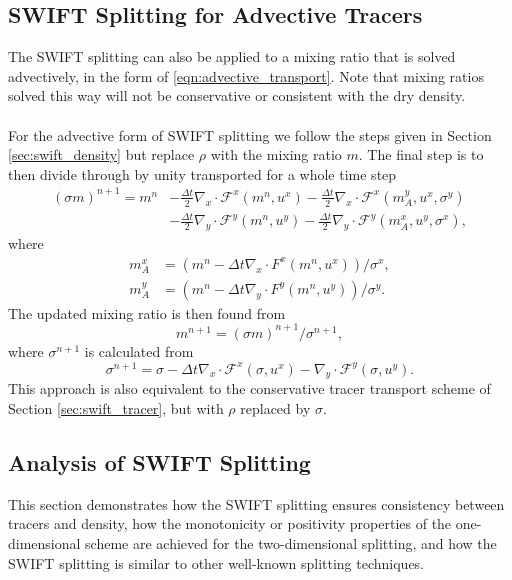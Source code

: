 \documentclass[11pt,a4paper]{article}
\begin{document}
\subsection{SWIFT Splitting for Advective Tracers}

The SWIFT splitting can also be applied to a mixing ratio that is solved advectively, in the form of \eqref{eqn:advective_transport}. Note that mixing ratios solved this way will not be conservative or consistent with the dry density. \\ 
\\
For the advective form of SWIFT splitting we follow the steps given in Section \ref{sec:swift_density} but replace $\rho$ with the mixing ratio $m$. The final step is to then divide through by unity transported for a whole time step
\begin{equation}
\begin{split}
(\sigma m)^{n+1} = m^{n} & - \frac{\Delta{t}}{2}\nabla_x\cdot \mathcal{F}^x(m^n, u^x) - \frac{\Delta{t}}{2}\nabla_x\cdot \mathcal{F}^x(m^y_A, u^x, \sigma^y) \\
& - \frac{\Delta{t}}{2}\nabla_y\cdot \mathcal{F}^y(m^n, u^y) - \frac{\Delta{t}}{2}\nabla_y\cdot \mathcal{F}^y(m^x_A, u^y, \sigma^x),
\end{split}
\end{equation}
where
\begin{align}
    m^x_A &= (m^n - \Delta{t} \nabla_x\cdot F^x(m^n, u^x)) / \sigma^x, \\
    m^y_A &= (m^n - \Delta{t} \nabla_y\cdot F^y(m^n, u^y)) / \sigma^y.
\end{align}
The updated mixing ratio is then found from
\begin{equation}
m^{n+1} = (\sigma m)^{n+1}/\sigma^{n+1},
\end{equation}
where $\sigma^{n+1}$ is calculated from
\begin{equation}
\sigma^{n+1} = \sigma - \Delta{t} \nabla_x\cdot \mathcal{F}^x(\sigma, u^x) -  \nabla_y \cdot \mathcal{F}^y(\sigma, u^y).
\end{equation}
This approach is also equivalent to the conservative tracer transport scheme of Section \ref{sec:swift_tracer}, but with $\rho$ replaced by $\sigma$.

\subsection{Analysis of SWIFT Splitting}

This section demonstrates how the SWIFT splitting ensures consistency between tracers and density, how the monotonicity or positivity properties of the one-dimensional scheme are achieved for the two-dimensional splitting, and how the SWIFT splitting is similar to other well-known splitting techniques. 
\end{document}
